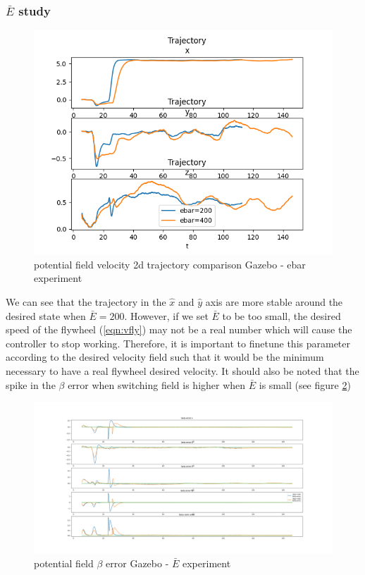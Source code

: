 \subsubsection{$\bar{E}$ study}
\begin{figure}[h!]
   \centering
   \includegraphics[width=\linewidth]{Images/gazebo_trajectory_ebar_potential_2d.png}
   \caption{potential field velocity 2d trajectory comparison Gazebo - ebar experiment}
   \label{fig:vel2dgazeboebarpotential}
\end{figure}
We can see that the trajectory in the $\hat{x}$ and $\hat{y}$ axis are more stable around the desired state when $\bar{E}=200$.
However, if we set $\bar{E}$ to be too small, the desired speed of the flywheel (\ref{eqn:vfly}) may not be a real number which will cause the controller to stop working.
Therefore, it is important to finetune this parameter according to the desired velocity field such that it would be the minimum necessary to have a real flywheel desired velocity.
It should also be noted that the spike in the $\beta$ error when switching field is higher when $\bar{E}$ is small (see figure \ref{fig:betaerrorgazebopotentialebar})
\begin{figure}[h!]
   \centering
   \includegraphics[width=\linewidth]{Images/gazebo_betaerror_ebar_potential.png}
   \caption{potential field $\beta$ error Gazebo - $\bar{E}$ experiment}
   \label{fig:betaerrorgazebopotentialebar}
\end{figure}

